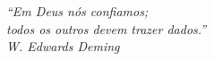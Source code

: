 \begin{epigrafe}
    \vspace*{\fill}
	\begin{flushright}
		\textit{``Em Deus nós confiamos; \\
		todos os outros devem trazer dados.''\\
		W. Edwards Deming}
	\end{flushright}
\end{epigrafe}
